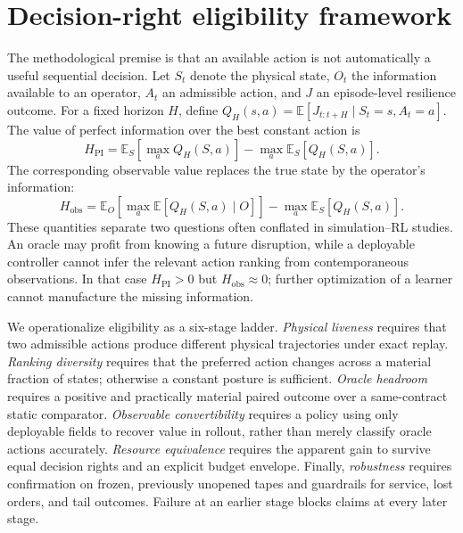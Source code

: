 \section{Decision-right eligibility framework}\label{sec:framework}

The methodological premise is that an available action is not automatically a useful
sequential decision. Let $S_t$ denote the physical state, $O_t$ the information available to
an operator, $A_t$ an admissible action, and $J$ an episode-level resilience outcome. For a
fixed horizon $H$, define $Q_H(s,a)=\mathbb{E}[J_{t:t+H}\mid S_t=s,A_t=a]$. The value of
perfect information over the best constant action is
\begin{equation}
H_{\mathrm{PI}}=\mathbb{E}_{S}\left[\max_a Q_H(S,a)\right]
-\max_a\mathbb{E}_{S}[Q_H(S,a)].
\end{equation}
The corresponding observable value replaces the true state by the operator's information:
\begin{equation}
H_{\mathrm{obs}}=\mathbb{E}_{O}\left[\max_a\mathbb{E}[Q_H(S,a)\mid O]\right]
-\max_a\mathbb{E}_{S}[Q_H(S,a)].
\end{equation}
These quantities separate two questions often conflated in simulation--RL studies. An oracle
may profit from knowing a future disruption, while a deployable controller cannot infer the
relevant action ranking from contemporaneous observations. In that case $H_{\mathrm{PI}}>0$
but $H_{\mathrm{obs}}\approx0$; further optimization of a learner cannot manufacture the
missing information.

We operationalize eligibility as a six-stage ladder. \emph{Physical liveness} requires that
two admissible actions produce different physical trajectories under exact replay.
\emph{Ranking diversity} requires that the preferred action changes across a material fraction
of states; otherwise a constant posture is sufficient. \emph{Oracle headroom} requires a
positive and practically material paired outcome over a same-contract static comparator.
\emph{Observable convertibility} requires a policy using only deployable fields to recover
value in rollout, rather than merely classify oracle actions accurately. \emph{Resource
equivalence} requires the apparent gain to survive equal decision rights and an explicit
budget envelope. Finally, \emph{robustness} requires confirmation on frozen, previously
unopened tapes and guardrails for service, lost orders, and tail outcomes. Failure at an
earlier stage blocks claims at every later stage.

